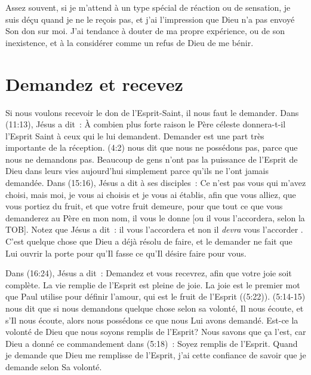 Assez souvent, si je m'attend à un type spécial de réaction ou de sensation,
 je suis déçu quand je ne le reçois pas, et j'ai l'impression que Dieu
 n'a pas envoyé Son don sur moi. J'ai tendance à douter de ma propre
 expérience, ou de son inexistence, et à la considérer
 comme un refus de Dieu de me bénir.


\section{Demandez et recevez}

Si nous voulons recevoir le don de l'Esprit-Saint,
 il nous faut le demander. Dans (11:13), Jésus a dit~:
 \og À combien plus forte raison le Père céleste donnera-t-il
 l'Esprit Saint à ceux qui le lui demandent. \fg{}
 Demander est une part très importante de la réception.
 (4:2) nous dit que nous ne possédons pas,
 parce que nous ne demandons pas. Beaucoup de gens n'ont pas
 la puissance de l'Esprit de Dieu dans leurs vies aujourd'hui
 simplement parce qu'ils ne l'ont jamais demandée.
 Dans (15:16), Jésus a dit à ses disciples~:
 \og Ce n'est pas vous qui m'avez choisi, mais moi,
 je vous ai choisis et je vous ai établis, afin que vous alliez,
 que vous portiez du fruit, et que votre fruit demeure,
 pour que tout ce que vous demanderez au Père en mon nom,
 il vous le donne [ou il vous l'accordera, selon la TOB]. \fg{}
 Notez que Jésus a dit~: \og il vous l'accordera \fg{} et non
 \og il \emph{devra} vous l'accorder \fg{}.
 C'est quelque chose que Dieu a déjà résolu de faire,
 et le demander ne fait que Lui ouvrir la porte pour qu'Il fasse
 ce qu'Il désire faire pour vous.
 \nowidow

Dans (16:24), Jésus a dit~:
 \og Demandez et vous recevrez, afin que votre joie soit complète. \fg{}
 La vie remplie de l'Esprit est pleine de joie.
 La joie est le premier mot que Paul utilise pour définir l'amour,
 qui est le fruit de l'Esprit ((5:22)).
 (5:14-15) nous dit que si nous demandons quelque chose
 selon sa volonté, Il nous écoute, et s'Il nous écoute,
 alors nous possédons ce que nous Lui avons demandé.
 Est-ce la volonté de Dieu que nous soyons remplis de l'Esprit?
 Nous savons que ça l'est, car Dieu a donné ce commandement dans
 (5:18)~: \og Soyez remplis de l'Esprit. \fg{}
 Quand je demande que Dieu me remplisse de l'Esprit,
 j'ai cette confiance de savoir que je demande selon Sa volonté.

